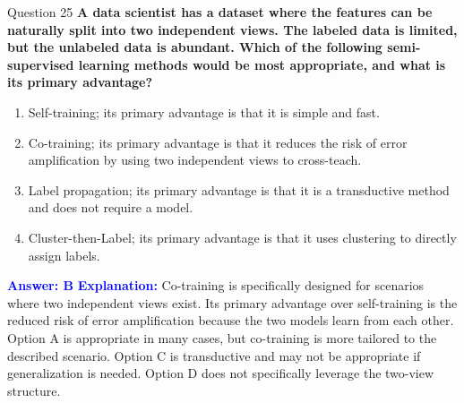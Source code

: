 \documentclass[8pt]{beamer}  %
\begin{document}
	\begin{frame}{Question 25}
		\textbf{A data scientist has a dataset where the features can be naturally split into two independent views. The labeled data is limited, but the unlabeled data is abundant. Which of the following semi-supervised learning methods would be most appropriate, and what is its primary advantage?}
		\begin{enumerate}
			\item Self-training; its primary advantage is that it is simple and fast.
			\item Co-training; its primary advantage is that it reduces the risk of error amplification by using two independent views to cross-teach.
			\item Label propagation; its primary advantage is that it is a transductive method and does not require a model.
			\item Cluster-then-Label; its primary advantage is that it uses clustering to directly assign labels.
		\end{enumerate}
		\vspace{0.2cm}
		\textcolor{blue}{\textbf{Answer: B}}
		\vspace{0.2cm}
		\textcolor{blue}{\textbf{Explanation:}} Co-training is specifically designed for scenarios where two independent views exist. Its primary advantage over self-training is the reduced risk of error amplification because the two models learn from each other. Option A is appropriate in many cases, but co-training is more tailored to the described scenario. Option C is transductive and may not be appropriate if generalization is needed. Option D does not specifically leverage the two-view structure.
	\end{frame}
	
\end{document}
